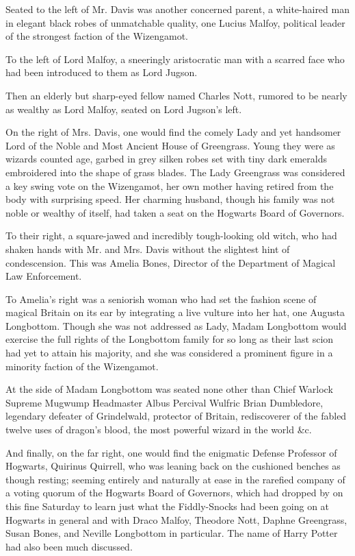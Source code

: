 Seated to the left of Mr. Davis was another concerned parent, a white-haired man in elegant black robes of unmatchable quality, one Lucius Malfoy, political leader of the strongest faction of the Wizengamot.

To the left of Lord Malfoy, a sneeringly aristocratic man with a scarred face who had been introduced to them as Lord Jugson.

Then an elderly but sharp-eyed fellow named Charles Nott, rumored to be nearly as wealthy as Lord Malfoy, seated on Lord Jugson's left.

On the right of Mrs. Davis, one would find the comely Lady and yet handsomer Lord of the Noble and Most Ancient House of Greengrass. Young they were as wizards counted age, garbed in grey silken robes set with tiny dark emeralds embroidered into the shape of grass blades. The Lady Greengrass was considered a key swing vote on the Wizengamot, her own mother having retired from the body with surprising speed. Her charming husband, though his family was not noble or wealthy of itself, had taken a seat on the Hogwarts Board of Governors.

To their right, a square-jawed and incredibly tough-looking old witch, who had shaken hands with Mr. and Mrs. Davis without the slightest hint of condescension. This was Amelia Bones, Director of the Department of Magical Law Enforcement.

To Amelia's right was a seniorish woman who had set the fashion scene of magical Britain on its ear by integrating a live vulture into her hat, one Augusta Longbottom. Though she was not addressed as Lady, Madam Longbottom would exercise the full rights of the Longbottom family for so long as their last scion had yet to attain his majority, and she was considered a prominent figure in a minority faction of the Wizengamot.

At the side of Madam Longbottom was seated none other than Chief Warlock Supreme Mugwump Headmaster Albus Percival Wulfric Brian Dumbledore, legendary defeater of Grindelwald, protector of Britain, rediscoverer of the fabled twelve uses of dragon's blood, the most powerful wizard in the world \&c.

And finally, on the far right, one would find the enigmatic Defense Professor of Hogwarts, Quirinus Quirrell, who was leaning back on the cushioned benches as though resting; seeming entirely and naturally at ease in the rarefied company of a voting quorum of the Hogwarts Board of Governors, which had dropped by on this fine Saturday to learn just what the Fiddly-Snocks had been going on at Hogwarts in general and with Draco Malfoy, Theodore Nott, Daphne Greengrass, Susan Bones, and Neville Longbottom in particular. The name of Harry Potter had also been much discussed.

